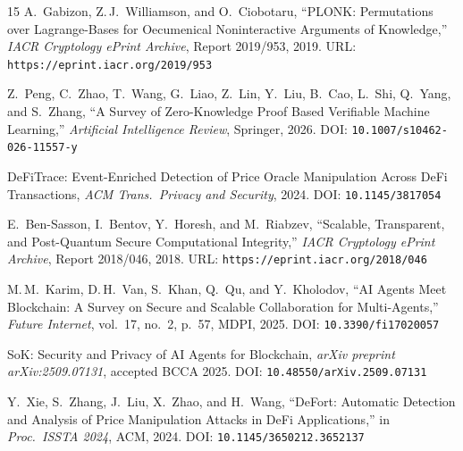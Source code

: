 \documentclass[final,5p,times,twocolumn]{elsarticle}
\theoremstyle{plain}
\theoremstyle{definition}
\theoremstyle{remark}
\begin{document}
\begin{thebibliography}{15}
A.\ Gabizon, Z.\,J.\ Williamson, and O.\ Ciobotaru,
``PLONK: Permutations over Lagrange-Bases for Oecumenical Noninteractive
Arguments of Knowledge,''
\textit{IACR Cryptology ePrint Archive}, Report 2019/953, 2019.
\newblock URL: \texttt{https://eprint.iacr.org/2019/953}

Z.\ Peng, C.\ Zhao, T.\ Wang, G.\ Liao, Z.\ Lin, Y.\ Liu, B.\ Cao,
L.\ Shi, Q.\ Yang, and S.\ Zhang,
``A Survey of Zero-Knowledge Proof Based Verifiable Machine Learning,''
\textit{Artificial Intelligence Review}, Springer, 2026.
\newblock DOI: \texttt{10.1007/s10462-026-11557-y}

DeFiTrace: Event-Enriched Detection of Price Oracle Manipulation Across DeFi
Transactions,
\textit{ACM Trans.\ Privacy and Security}, 2024.
\newblock DOI: \texttt{10.1145/3817054}

E.\ Ben-Sasson, I.\ Bentov, Y.\ Horesh, and M.\ Riabzev,
``Scalable, Transparent, and Post-Quantum Secure Computational Integrity,''
\textit{IACR Cryptology ePrint Archive}, Report 2018/046, 2018.
\newblock URL: \texttt{https://eprint.iacr.org/2018/046}

M.\,M.\ Karim, D.\,H.\ Van, S.\ Khan, Q.\ Qu, and Y.\ Kholodov,
``AI Agents Meet Blockchain: A Survey on Secure and Scalable Collaboration
for Multi-Agents,''
\textit{Future Internet}, vol.\ 17, no.\ 2, p.\ 57, MDPI, 2025.
\newblock DOI: \texttt{10.3390/fi17020057}

SoK: Security and Privacy of AI Agents for Blockchain,
\textit{arXiv preprint arXiv:2509.07131}, accepted BCCA 2025.
\newblock DOI: \texttt{10.48550/arXiv.2509.07131}

Y.\ Xie, S.\ Zhang, J.\ Liu, X.\ Zhao, and H.\ Wang,
``DeFort: Automatic Detection and Analysis of Price Manipulation Attacks in
DeFi Applications,''
in \textit{Proc.\ ISSTA 2024}, ACM, 2024.
\newblock DOI: \texttt{10.1145/3650212.3652137}

\end{thebibliography}
\end{document}
